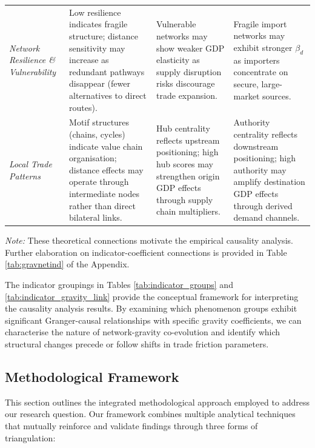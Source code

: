 \documentclass[preprint, 3p,
authoryear]{elsarticle} %
\begin{document}
\begin{table}[H]
\begin{tabular}{@{}p{2.8cm}p{4.2cm}p{4.2cm}p{3.8cm}@{}}
\textit{Network Resilience \& Vulnerability} & 
Low resilience indicates fragile structure; distance sensitivity may increase as redundant pathways disappear (fewer alternatives to direct routes). & 
Vulnerable networks may show weaker GDP elasticity as supply disruption risks discourage trade expansion. & 
Fragile import networks may exhibit stronger $\beta_d$ as importers concentrate on secure, large-market sources. \\
\addlinespace

\textit{Local Trade Patterns} & 
Motif structures (chains, cycles) indicate value chain organisation; distance effects may operate through intermediate nodes rather than direct bilateral links. & 
Hub centrality reflects upstream positioning; high hub scores may strengthen origin GDP effects through supply chain multipliers. & 
Authority centrality reflects downstream positioning; high authority may amplify destination GDP effects through derived demand channels. \\

\bottomrule
\end{tabular}
\begin{tablenotes}
\scriptsize
\item \textit{Note:} These theoretical connections motivate the empirical causality analysis. Further elaboration on indicator-coefficient connections is provided in Table \ref{tab:gravnetind} of the Appendix.
\end{tablenotes}
\end{table}

The indicator groupings in Tables \ref{tab:indicator_groups} and
\ref{tab:indicator_gravity_link} provide the conceptual framework for
interpreting the causality analysis results. By examining which
phenomenon groups exhibit significant Granger-causal relationships with
specific gravity coefficients, we can characterise the nature of
network-gravity co-evolution and identify which structural changes
precede or follow shifts in trade friction parameters.

\subsection{Methodological Framework}\label{methodological-framework}

This section outlines the integrated methodological approach employed to
address our research question. Our framework combines multiple
analytical techniques that mutually reinforce and validate findings
through three forms of triangulation:
\end{document}
